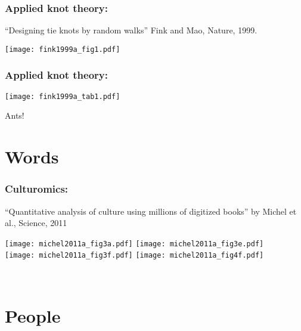\begin{frame}
  \frametitle{Applied knot theory:}

  ``Designing tie knots by random walks''\cite{fink1999a}
  Fink and Mao, Nature, 1999.

  \texttt{[image: fink1999a\_fig1.pdf]}

\end{frame}

\begin{frame}
  \frametitle{Applied knot theory:}
  
  
  \texttt{[image: fink1999a\_tab1.pdf]}

\end{frame}

\begin{frame}

  Ants!
\end{frame}


\section{Words}

\begin{frame}
  \frametitle{Culturomics:}

  \small{``Quantitative analysis of culture using millions of
    digitized books'' by Michel et al., Science, 2011\cite{michel2011a}}

  \texttt{[image: michel2011a\_fig3a.pdf]} 
  \texttt{[image: michel2011a\_fig3e.pdf]} \\
  \texttt{[image: michel2011a\_fig3f.pdf]}
  \texttt{[image: michel2011a\_fig4f.pdf]}

  {\small
    \\
  }

\end{frame}

\section{People}

